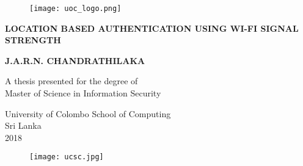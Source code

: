 \begin{titlepage}
    \begin{center}
        \vspace*{0.1cm}
        
        \begin{figure}[h]
        	\centering
        	\texttt{[image: uoc\_logo.png]}
        \end{figure}
        
        \Huge
        \textbf{LOCATION BASED AUTHENTICATION USING WI-FI SIGNAL STRENGTH}
        

        
        \vspace{1.5cm}
        
        \large
        \textbf{J.A.R.N. CHANDRATHILAKA}
        
        \vfill
        
        A thesis presented for the degree of\\
        Master of Science in Information Security
        
        \vspace{0.8cm}
        
        
        University of Colombo School of Computing\\
        Sri Lanka\\
        2018
        \begin{figure}[h]
        	\centering
        	\texttt{[image: ucsc.jpg]}
        \end{figure}
        
    \end{center}
\end{titlepage}